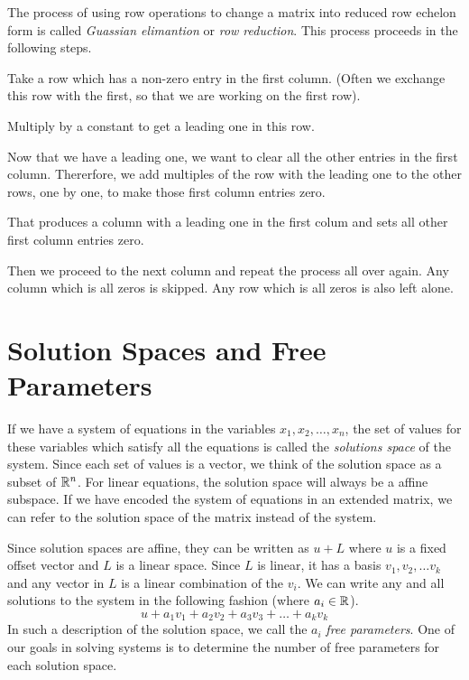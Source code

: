 \documentclass[fleqn]{report}
\begin{document}
\begin{defn}
The process of using row operations to change a matrix into
reduced row echelon form is called \emph{Guassian elimantion} or
\emph{row reduction}. This process proceeds in the following steps.
\begin{smallitemize}
\item Take a row which has a non-zero entry in the first
column. (Often we exchange this row with the first, so that we
are working on the first row). 
\item Multiply by a constant to get a leading one in this row.
\item Now that we have a leading one, we want to clear all the
other entries in the first column. Thererfore, we add multiples of
the row with the leading one to the other rows, one by one, to
make those first column entries zero.
\item That produces a column with a leading one in the first
colum and sets all other first column entries zero. 
\item Then we proceed to the next column and repeat
the process all over again. Any column which is all zeros is
skipped. Any row which is all zeros is also left alone.
\end{smallitemize}
\end{defn}

\section{Solution Spaces and Free Parameters}

\begin{defn}
If we have a system of equations in the variables $x_1, x_2,
\ldots, x_n$, the set of values for these variables which
satisfy all the equations is called the \emph{solutions space}
of the system. Since each set of values is a vector, we think
of the solution space as a subset of $\mathbb{R}^n$. For linear
equations, the solution space will always be a affine subspace.
If we have encoded the system of equations in an extended
matrix, we can refer to the solution space of the matrix
instead of the system.
\end{defn}

\begin{defn}
Since solution spaces are affine, they can be written as $u +
L$ where $u$ is a fixed offset vector and $L$ is a linear
space. Since $L$ is linear, it has a basis $v_1, v_2, \ldots
v_k$ and any vector in $L$ is a linear combination of the
$v_i$. We can write any and all solutions to the
system in the following fashion (where $a_i \in \mathbb{R}$).
\begin{equation*}
u + a_1v_1 + a_2v_2 + a_3v_3 + \ldots + a_kv_k
\end{equation*}
In such a description of the solution space, we call the $a_i$
\emph{free parameters}. One of our goals in solving systems is
to determine the number of free parameters for each solution
space.
\end{defn}
\end{document}
